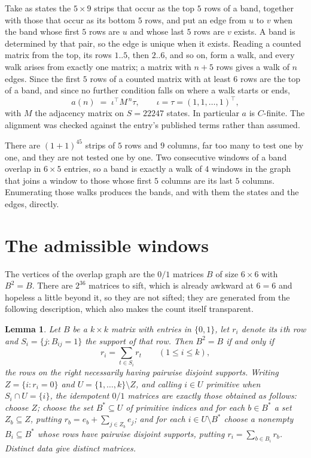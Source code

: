 \documentclass[11pt,a4paper]{article}
\theoremstyle{plain}
\newtheorem{lemma}[theorem]{Lemma}
\theoremstyle{definition}
\begin{document}
Take as states the $5\times9$ strips that occur as the top $5$ rows of a band,
together with those that occur as its bottom $5$ rows, and put an edge from $u$ to $v$
when the band whose first $5$ rows are $u$ and whose last $5$ rows are $v$ exists.
A band is determined by that pair, so the edge is unique when it exists. Reading a counted
matrix from the top, its rows $1..5$, then $2..6$, and so on, form a walk, and every
walk arises from exactly one matrix; a matrix with $n+5$ rows gives a walk of $n$ edges.
Since the first $5$ rows of a counted matrix with at least $6$ rows are the top of a
band, and since no further condition falls on where a walk starts or ends,
\[
a(n)\;=\;\iota^{\!\top}M^{\,n}\tau ,\qquad \iota=\tau=(1,1,\dots,1)^{\!\top},
\]
with $M$ the adjacency matrix on $S=22247$ states. In particular $a$ is $C$-finite. The
alignment was checked against the entry's published terms rather than assumed.

There are $(1 + 1)^{45}$ strips of $5$ rows and $9$ columns, far too
many to test one by one, and they are not tested one by one. Two consecutive windows of a band
overlap in $6\times5$ entries, so a band is exactly a walk of $4$ windows in
the graph that joins a window to those whose first $5$ columns are its last $5$
columns. Enumerating those walks produces the bands, and with them the states and the edges,
directly.

\section{The admissible windows}

The vertices of the overlap graph are the $0/1$ matrices $B$ of size $6\times6$ with
$B^2=B$. There are $2^{36}$ matrices to sift, which is already awkward at $6=6$ and
hopeless a little beyond it, so they are not sifted; they are generated from the following
description, which also makes the count itself transparent.

\begin{lemma}\label{lem:idem}
Let $B$ be a $k\times k$ matrix with entries in $\{0,1\}$, let $r_i$ denote its $i$th row and
$S_i=\{j:B_{ij}=1\}$ the support of that row. Then $B^2=B$ if and only if
\[
r_i=\sum_{t\in S_i}r_t \qquad (1\le i\le k),
\]
the rows on the right necessarily having pairwise disjoint supports. Writing
$Z=\{i:r_i=0\}$ and $U=\{1,\dots,k\}\setminus Z$, and calling $i\in U$ \emph{primitive}
when $S_i\cap U=\{i\}$, the idempotent $0/1$ matrices are exactly those obtained as follows:
choose $Z$; choose the set $B^{\ast}\subseteq U$ of primitive indices and for each
$b\in B^{\ast}$ a set $Z_b\subseteq Z$, putting $r_b=e_b+\sum_{j\in Z_b}e_j$; and for each
$i\in U\setminus B^{\ast}$ choose a nonempty $B_i\subseteq B^{\ast}$ whose rows have
pairwise disjoint supports, putting $r_i=\sum_{b\in B_i}r_b$. Distinct data give distinct
matrices.
\end{lemma}
\end{document}

